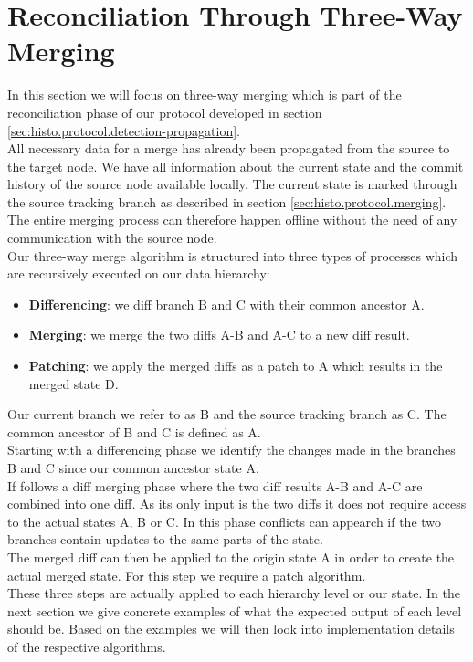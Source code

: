 
\section{Reconciliation Through Three-Way Merging}
\label{sec:histo.merging}
In this section we will focus on three-way merging which is part of the reconciliation phase of our protocol developed in section \ref{sec:histo.protocol.detection-propagation}.\\
All necessary data for a merge has already been propagated from the source to the target node.
We have all information about the current state and the commit history of the source node available locally.
The current state is marked through the source tracking branch as described in section \ref{sec:histo.protocol.merging}.
The entire merging process can therefore happen offline without the need of any communication with the source node.\\
Our three-way merge algorithm is structured into three types of processes which are recursively executed on our data hierarchy:

\begin{itemize}
\item \textbf{Differencing}: we diff branch B and C with their common ancestor A.
\item \textbf{Merging}: we merge the two diffs A-B and A-C to a new diff result.
\item \textbf{Patching}: we apply the merged diffs as a patch to A which results in the merged state D.
\end{itemize}

Our current branch we refer to as B and the source tracking branch as C.
The common ancestor of B and C is defined as A.\\
Starting with a differencing phase we identify the changes made in the branches B and C since our common ancestor state A.\\
If follows a diff merging phase where the two diff results A-B and A-C are combined into one diff.
As its only input is the two diffs it does not require access to the actual states A, B or C.
In this phase conflicts can appearch if the two branches contain updates to the same parts of the state.\\
The merged diff can then be applied to the origin state A in order to create the actual merged state.
For this step we require a patch algorithm.\\
These three steps are actually applied to each hierarchy level or our state.
In the next section we give concrete examples of what the expected output of each level should be.
Based on the examples we will then look into implementation details of the respective algorithms.

